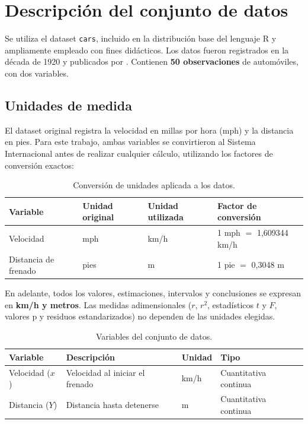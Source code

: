 \documentclass[12pt,a4paper]{article}
\begin{document}
\section{Descripción del conjunto de datos}

Se utiliza el dataset \texttt{cars}, incluido en la distribución base del lenguaje R y ampliamente empleado con fines didácticos. Los datos fueron registrados en la década de 1920 y publicados por \cite{ezekiel}. Contienen \textbf{50 observaciones} de automóviles, con dos variables.

\subsection{Unidades de medida}

El dataset original registra la velocidad en millas por hora (mph) y la distancia en pies. Para este trabajo, ambas variables se convirtieron al Sistema Internacional antes de realizar cualquier cálculo, utilizando los factores de conversión exactos:

\begin{table}[H]
\centering
\caption{Conversión de unidades aplicada a los datos.}
\begin{tabular}{llll}
\toprule
\textbf{Variable} & \textbf{Unidad original} & \textbf{Unidad utilizada} & \textbf{Factor de conversión} \\
\midrule
Velocidad & mph & km/h & 1 mph $=$ 1{,}609344 km/h \\
Distancia de frenado & pies & m & 1 pie $=$ 0{,}3048 m \\
\bottomrule
\end{tabular}
\end{table}

En adelante, todos los valores, estimaciones, intervalos y conclusiones se expresan en \textbf{km/h y metros}. Las medidas adimensionales ($r$, $r^2$, estadísticos $t$ y $F$, valores p y residuos estandarizados) no dependen de las unidades elegidas.

\begin{table}[H]
\centering
\caption{Variables del conjunto de datos.}
\begin{tabular}{llll}
\toprule
\textbf{Variable} & \textbf{Descripción} & \textbf{Unidad} & \textbf{Tipo} \\
\midrule
Velocidad ($x$) & Velocidad al iniciar el frenado & km/h & Cuantitativa continua \\
Distancia ($Y$) & Distancia hasta detenerse & m & Cuantitativa continua \\
\bottomrule
\end{tabular}
\end{table}
\end{document}
